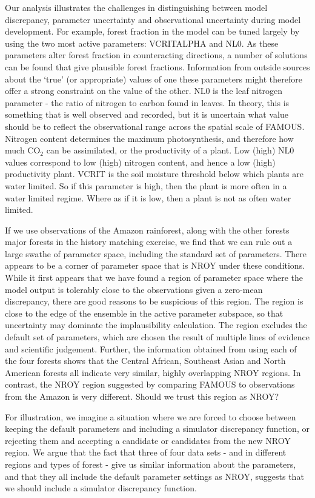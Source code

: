 \documentclass[esd, manuscript]{copernicus}
\begin{document}
Our analysis illustrates the challenges in distinguishing between model discrepancy, parameter uncertainty and observational uncertainty during model development. For example, forest fraction in the model can be tuned largely by using the two most active parameters: VCRITALPHA and NL0.  As these parameters alter forest fraction in counteracting directions, a number of solutions can be found that give plausible forest fractions. Information from outside sources about the `true' (or appropriate) values of one these parameters might therefore offer a strong constraint on the value of the other. NL0 is the leaf nitrogen parameter - the ratio of nitrogen to carbon found in leaves. In theory, this is something that is well observed and recorded, but it is  uncertain what value should be to reflect the observational range across the spatial scale of FAMOUS. Nitrogen content determines the maximum photosynthesis, and therefore how much CO$_2$ can be assimilated, or the productivity of a plant. Low (high) NL0 values correspond to low (high) nitrogen content, and hence a low (high) productivity plant. VCRIT is the soil moisture threshold below which plants are water limited.  So if this parameter is high, then the plant is more often in a water limited regime. Where as if it is low, then a plant is not as often water limited.

If we use observations of the Amazon rainforest, along with the other forests major forests in the history matching exercise, we find that we can rule out a large swathe of parameter space, including the standard set of parameters. There appears to be a corner of parameter space that is NROY under these conditions. While it first appears that we have found a region of parameter space where the model output is tolerably close to the observations given a zero-mean discrepancy, there are good reasons to be suspicious of this region. The region is close to the edge of the ensemble in the active parameter subspace, so that uncertainty may dominate the implausibility calculation. The region excludes the default set of parameters, which are chosen the result of multiple lines of evidence and scientific judgement. Further, the information obtained from using each of the four forests shows that the Central African, Southeast Asian and North American forests all indicate very similar, highly overlapping NROY regions. In contrast, the NROY region suggested by comparing FAMOUS to observations from the Amazon is very different. Should we trust this region as NROY? 

For illustration, we imagine a situation where we are forced to choose between keeping the default parameters and including a simulator discrepancy function, or rejecting them and accepting a candidate or candidates from the new NROY region. We argue that the fact that three of four data sets - and in different regions and types of forest - give us similar information about the parameters, and that they all include the default parameter settings as NROY, suggests that we should include a simulator discrepancy function.
\end{document}
